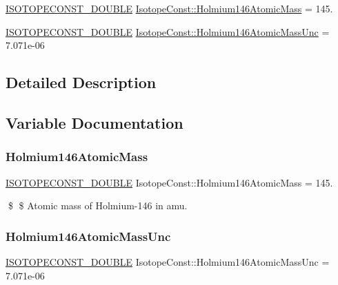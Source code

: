 \begin{DoxyCompactItemize}
\item 
\mbox{\hyperlink{group___isotope_const-_macros_ga8f45a7272ce02c0b4c65c44636ed719a}{I\+S\+O\+T\+O\+P\+E\+C\+O\+N\+S\+T\+\_\+\+D\+O\+U\+B\+LE}} \mbox{\hyperlink{group___isotope_const-_holmium-_ho146_ga391d0886c419499c257a4e4629a5cc55}{Isotope\+Const\+::\+Holmium146\+Atomic\+Mass}} = 145.
\item 
\mbox{\hyperlink{group___isotope_const-_macros_ga8f45a7272ce02c0b4c65c44636ed719a}{I\+S\+O\+T\+O\+P\+E\+C\+O\+N\+S\+T\+\_\+\+D\+O\+U\+B\+LE}} \mbox{\hyperlink{group___isotope_const-_holmium-_ho146_gaa87eec0d8c9b41f3b3107e71ccd300c8}{Isotope\+Const\+::\+Holmium146\+Atomic\+Mass\+Unc}} = 7.\+071e-\/06
\end{DoxyCompactItemize}


\subsection{Detailed Description}


\subsection{Variable Documentation}
\mbox{\label{group___isotope_const-_holmium-_ho146_ga391d0886c419499c257a4e4629a5cc55}} 
\subsubsection{\texorpdfstring{Holmium146\+Atomic\+Mass}{Holmium146AtomicMass}}
{\footnotesize\ttfamily \mbox{\hyperlink{group___isotope_const-_macros_ga8f45a7272ce02c0b4c65c44636ed719a}{I\+S\+O\+T\+O\+P\+E\+C\+O\+N\+S\+T\+\_\+\+D\+O\+U\+B\+LE}} Isotope\+Const\+::\+Holmium146\+Atomic\+Mass = 145.}

\$ \$ Atomic mass of Holmium-\/146 in amu. \mbox{\label{group___isotope_const-_holmium-_ho146_gaa87eec0d8c9b41f3b3107e71ccd300c8}} 
\subsubsection{\texorpdfstring{Holmium146\+Atomic\+Mass\+Unc}{Holmium146AtomicMassUnc}}
{\footnotesize\ttfamily \mbox{\hyperlink{group___isotope_const-_macros_ga8f45a7272ce02c0b4c65c44636ed719a}{I\+S\+O\+T\+O\+P\+E\+C\+O\+N\+S\+T\+\_\+\+D\+O\+U\+B\+LE}} Isotope\+Const\+::\+Holmium146\+Atomic\+Mass\+Unc = 7.\+071e-\/06}

